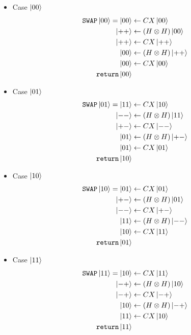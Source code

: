 \documentclass[11pt]{article}
\def\swap{\texttt{SWAP}}
\begin{document}
\begin{itemize}
\item[] Case $\ket{00}$ 
\begin{align*}
    \swap\ket{00} = 
    \ket{00} &\leftarrow CX\ket{00} \\
    \ket{++} &\leftarrow (H \otimes H)\ket{00} \\
    \ket{++} &\leftarrow CX\ket{++} \\
    \ket{00} &\leftarrow (H \otimes H)\ket{++} \\
    \ket{00} &\leftarrow CX\ket{00}  \\
     \texttt{return} \ket{00}
\end{align*}


\item[] Case $\ket{01}$ 
\begin{align*}
    \swap\ket{01} =  %
    \ket{11} &\leftarrow CX\ket{10} \\
    \ket{--} &\leftarrow (H \otimes H)\ket{11} \\
    \ket{+-} &\leftarrow CX\ket{--} \\
    \ket{01} &\leftarrow (H \otimes H)\ket{+-} \\
    \ket{01} &\leftarrow CX\ket{01}  \\
     \texttt{return} \ket{10}
\end{align*}

\item[] Case $\ket{10}$ 
\begin{align*}
    \swap\ket{10} =  %
    \ket{01} &\leftarrow CX\ket{01} \\
    \ket{+-} &\leftarrow (H \otimes H)\ket{01} \\
    \ket{--} &\leftarrow CX\ket{+-} \\
    \ket{11} &\leftarrow (H \otimes H)\ket{--} \\
    \ket{10} &\leftarrow CX\ket{11}  \\
     \texttt{return} \ket{01}
\end{align*}

\item[] Case $\ket{11}$ 
\begin{align*}
    \swap\ket{11} = 
    \ket{10} &\leftarrow CX\ket{11} \\
    \ket{-+} &\leftarrow (H \otimes H)\ket{10} \\
    \ket{-+} &\leftarrow CX\ket{-+} \\
    \ket{10} &\leftarrow (H \otimes H)\ket{-+} \\
    \ket{11} &\leftarrow CX\ket{10}  \\
     \texttt{return} \ket{11}
\end{align*}


\end{itemize}
\end{document}
